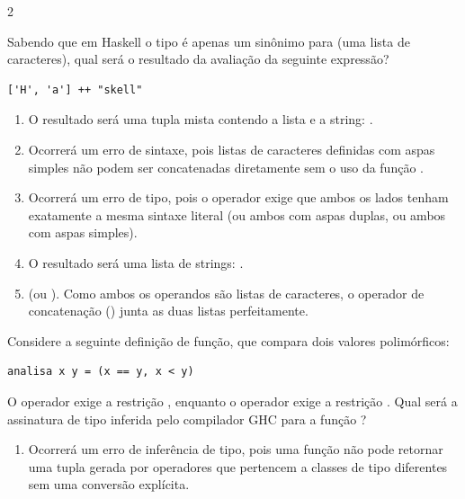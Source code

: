 \documentclass[a4paper,10pt,brazil]{article}
\begin{document}
\begin{multicols}{2}
\begin{enumerate}
\end{enumerate}

Sabendo que em Haskell o tipo  é apenas um sinônimo para \haskellinline{[Char]} (uma lista de caracteres), qual será o resultado da avaliação da seguinte expressão?
\begin{verbatim}
['H', 'a'] ++ "skell"
\end{verbatim}

\begin{enumerate}
  \item O resultado será uma tupla mista contendo a lista e a string: .

  \item Ocorrerá um erro de sintaxe, pois listas de caracteres definidas com aspas simples não podem ser concatenadas diretamente sem o uso da função .

  \item Ocorrerá um erro de tipo, pois o operador \haskellinline{++} exige que ambos os lados tenham exatamente a mesma sintaxe literal (ou ambos com aspas duplas, ou ambos com aspas simples).

  \item O resultado será uma lista de strings: \haskellinline{["Ha", "skell"]}.

  \item {} (ou \haskellinline{['H', 'a', 's', 'k', 'e', 'l', 'l']}). Como ambos os operandos são listas de caracteres, o operador de concatenação (\haskellinline{++}) junta as duas listas perfeitamente.


\end{enumerate}

Considere a seguinte definição de função, que compara dois valores polimórficos:
\begin{verbatim}
analisa x y = (x == y, x < y)
\end{verbatim}
O operador \haskellinline{==} exige a restrição , enquanto o operador \haskellinline{<} exige a restrição . Qual será a assinatura de tipo inferida pelo compilador GHC para a função ?

\begin{enumerate}
  \item Ocorrerá um erro de inferência de tipo, pois uma função não pode retornar uma tupla gerada por operadores que pertencem a classes de tipo diferentes sem uma conversão explícita.


\end{enumerate}
\end{multicols}
\end{document}
